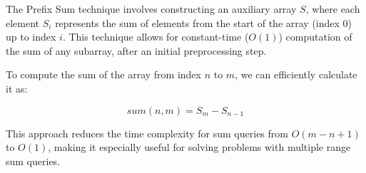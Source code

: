 
The Prefix Sum technique involves constructing an auxiliary array \( S \), where each element \( S_i \) represents the sum of elements from the start of the array (index 0) up to index \( i \). This technique allows for constant-time (\( O(1) \)) computation of the sum of any subarray, after an initial preprocessing step.

To compute the sum of the array from index \( n \) to \( m \), we can efficiently calculate it as:

\[
sum(n, m) = S_m - S_{n-1}
\]

This approach reduces the time complexity for sum queries from \( O(m - n + 1) \) to \( O(1) \), making it especially useful for solving problems with multiple range sum queries.